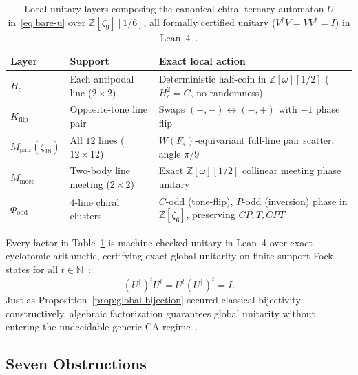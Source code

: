 \begin{table}[tb]
\centering
\caption{Local unitary layers composing the canonical chiral ternary automaton $U$ in~\eqref{eq:bare-u} over $\mathbb{Z}[\zeta_9][1/6]$, all formally certified unitary ($V^{\dagger}V = VV^{\dagger} = I$) in Lean~4~\cite{pollard2026repo}.}
\label{tab:u-layers}
\small
\begin{tabularx}{\textwidth}{@{}llX@{}}
\toprule
Layer & Support & Exact local action \\
\midrule
$H_c$ & Each antipodal line ($2\times 2$) & Deterministic half-coin in $\mathbb{Z}[\omega][1/2]$ ($H_c^2 = C$, no randomness) \\
$K_{\mathrm{flip}}$ & Opposite-tone line pair & Swaps $(+,-) \leftrightarrow (-,+)$ with $-1$ phase flip \\
$M_{\mathrm{pair}}(\zeta_{18})$ & All $12$ lines ($12 \times 12$) & $W(F_4)$-equivariant full-line pair scatter, angle $\pi/9$ \\
$M_{\mathrm{meet}}$ & Two-body line meeting ($2\times 2$) & Exact $\mathbb{Z}[\omega][1/2]$ collinear meeting phase unitary \\
$\Phi_{\mathrm{odd}}$ & $4$-line chiral clusters & $C$-odd (tone-flip), $P$-odd (inversion) phase in $\mathbb{Z}[\zeta_6]$, preserving $CP,T,CPT$ \\
\bottomrule
\end{tabularx}
\end{table}

Every factor in Table~\ref{tab:u-layers} is machine-checked unitary in Lean~4 over exact cyclotomic arithmetic, certifying exact global unitarity on finite-support Fock states for all $t \in \mathbb{N}$~\cite{pollard2026repo}:
\begin{equation}
\label{eq:global-unitarity}
(U^{\dagger})^t U^t = U^t (U^{\dagger})^t = I.
\end{equation}
Just as Proposition~\ref{prop:global-bijection} secured classical bijectivity constructively, algebraic factorization guarantees global unitarity without entering the undecidable generic-CA regime~\cite{margenstern2008injectivity}.

\subsection{Seven Obstructions}
\label{subsec:seven-obstructions}

